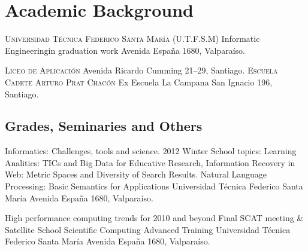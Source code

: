 \section{Academic Background}
	{\textsc{Universidad T\'ecnica Federico Santa Mar\'ia (U.T.F.S.M)}}
	{Informatic Engineering}{in graduation work}
	{}
	{Avenida España 1680, Valparaíso.}
	

	{\textsc{Liceo de Aplicaci\'on}}
	{}
	{}
	{}
	{Avenida Ricardo Cumming 21--29, Santiago.}
	{\textsc{Escuela Cadete Arturo Prat Chac\'on}}
	{Ex Escuela La Campana}
	{}
	{}
	{San Ignacio 196, Santiago.}

\subsection{Grades, Seminaries and Others}

	{Informatics: Challenges, tools and science.}
	{2012 Winter School}
	{topics: Learning Analitics: TICs and Big Data for Educative Research, Information Recovery in Web: Metric Spaces and Diversity of Search Results. Natural Language Processing: Basic Semantics for Applications }
	{Universidad T\'ecnica Federico Santa Mar\'ia}
	{Avenida España 1680, Valpara\'iso.}
	
	
	{High performance computing trends for 2010 and beyond}
	{Final SCAT meeting \& Satellite School}
	{Scientific Computing Advanced Training}
	{Universidad T\'ecnica Federico Santa Mar\'ia}
	{Avenida España 1680, Valpara\'iso.}

%	
%	
%	
%
%	
